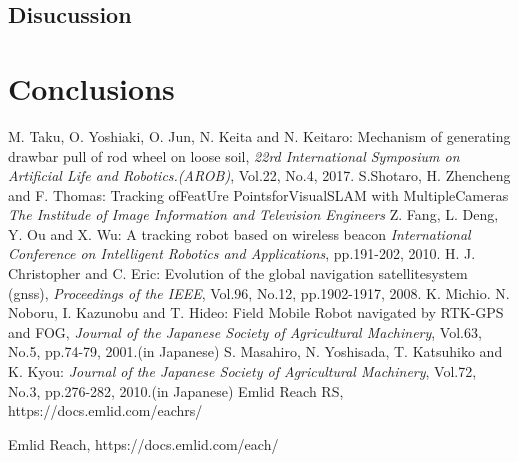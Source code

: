 \documentclass[a4paper]{article}
\begin{document}
\subsection{Disucussion}
%
%
%
%
%

\section{Conclusions}
%
%
%
%
%
%

\begin{thebibliography}{99}
M. Taku, O. Yoshiaki, O. Jun, N. Keita and N. Keitaro:
Mechanism of generating drawbar pull of rod wheel on loose soil,
{\it 22rd International Symposium on Artificial Life and Robotics.(AROB)}, Vol.22, No.4, 2017.
S.Shotaro, H. Zhencheng and F. Thomas:
Tracking ofFeatUre PointsforVisualSLAM with MultipleCameras
{\it The Institude of Image Information and Television Engineers}
Z. Fang, L. Deng, Y. Ou and X. Wu:
A tracking robot based on wireless beacon
{\it International Conference on Intelligent Robotics and Applications}, pp.191-202, 2010.
H. J. Christopher and C. Eric:
Evolution of the global navigation satellitesystem (gnss),
{\it Proceedings of the IEEE}, Vol.96, No.12, pp.1902-1917, 2008.
K. Michio. N. Noboru, I. Kazunobu and T. Hideo: 
Field Mobile Robot navigated by RTK-GPS and FOG, 
{\it Journal of the Japanese Society of Agricultural Machinery}, Vol.63, No.5, pp.74-79, 2001.(in Japanese)
S. Masahiro, N. Yoshisada, T. Katsuhiko and K. Kyou: 
{\it Journal of the Japanese Society of Agricultural Machinery}, Vol.72, No.3, pp.276-282, 2010.(in Japanese)
Emlid Reach RS, https://docs.emlid.com/eachrs/

Emlid Reach, https://docs.emlid.com/each/
\end{thebibliography}
\end{document}
